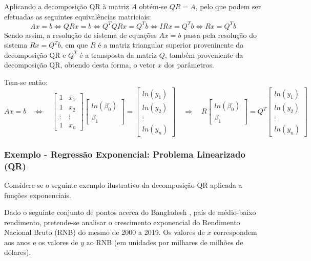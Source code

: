\documentclass[]{article}
\numberwithin{equation}{subsection}
\begin{document}
Aplicando a decomposição QR à matriz \(A\) obtém-se \(QR=A\), pelo que
podem ser efetuadas as seguintes equivalências matriciais:
\begin{equation}
Ax=b \Leftrightarrow QRx=b \Leftrightarrow Q^TQRx=Q^Tb \Leftrightarrow IRx=Q^Tb \Leftrightarrow Rx=Q^Tb
\end{equation} Sendo assim, a resolução do sistema de equações \(Ax=b\)
passa pela resolução do sistema \(Rx=Q^Tb\), em que \(R\) é a matriz
triangular superior proveninente da decomposição QR e \(Q^T\) é a
transposta da matriz \(Q\), também proveniente da decomposição QR,
obtendo desta forma, o vetor \(x\) dos parâmetros.

Tem-se então: \begin{equation} \label{eq:exp_qr1}
Ax=b
\quad \Leftrightarrow \quad
\begin{bmatrix}
1 & x_1 \\ 1 & x_2 \\ \vdots & \vdots \\ 1 & x_n
\end{bmatrix}
\begin{bmatrix}
ln(\beta_0) \\ \beta_1
\end{bmatrix}
=
\begin{bmatrix}
ln(y_1) \\ ln(y_2) \\ \vdots \\ ln(y_n)
\end{bmatrix}
\quad \Rightarrow \quad
R
\begin{bmatrix}
ln(\beta_0) \\ \beta_1
\end{bmatrix}
=
Q^T
\begin{bmatrix}
ln(y_1) \\ ln(y_2) \\ \vdots \\ ln(y_n)
\end{bmatrix}
\end{equation}

\subsubsection{Exemplo - Regressão Exponencial: Problema Linearizado (QR)} \label{QR_exemplo}

Considere-se o seguinte exemplo ilustrativo da decomposição QR aplicada
a funções exponenciais.

Dado o seguinte conjunto de pontos acerca do Bangladesh \cite{Bang},
país de médio-baixo rendimento, pretende-se analisar o crescimento
exponencial do Rendimento Nacional Bruto (RNB) do mesmo de 2000 a 2019.
Os valores de \(x\) correspondem aos anos e os valores de \(y\) ao RNB
(em unidades por milhares de milhões de dólares).
\end{document}

